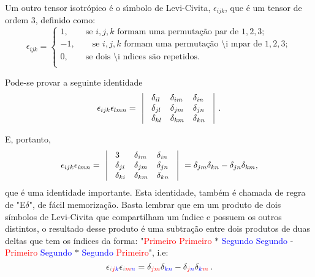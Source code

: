 Um outro tensor isotr\'opico \'e o s\'\i mbolo de Levi-Civita,
$\epsilon_{ijk}$, que \'e um tensor de ordem $3$, definido como:
\begin{equation}
\epsilon_{ijk}=\left\{ \begin{array}{l}
           1,\mbox{   }\mbox{   }\mbox{   }\mbox{se $i,j,k$ formam uma
permuta\c{c}\~ao par de $1,2,3$};\\
          -1,\mbox{   }\mbox{   }\mbox{   }\mbox{se $i,j,k$ formam uma
permuta\c{c}\~ao \'\i mpar de $1,2,3$};\\
           0,\mbox{   }\mbox{   }\mbox{   }\mbox{se dois \'\i ndices s\~ao repetidos}.\\
\end{array} \right.
\end{equation}

Pode-se provar a seguinte identidade
\begin{equation}
\epsilon_{ijk}\epsilon_{lmn}= \begin{array}{lllll}
                \vline & \delta_{il} & \delta_{im} & \delta_{in} & \vline\\
                \vline &\delta_{jl} & \delta_{jm} & \delta_{jn} &\vline\\
                 \vline &\delta_{kl} & \delta_{km} & \delta_{kn} &\vline\\
\end{array}.
\end{equation}

E, portanto,
\begin{equation}
\epsilon_{ijk}\epsilon_{imn}= \begin{array}{lllll}
                \vline & 3 & \delta_{im} & \delta_{in}&\vline \\
                \vline & \delta_{ji} & \delta_{jm} & \delta_{jn}& \vline\\
               \vline & \delta_{ki} & \delta_{km} & \delta_{kn}& \vline\\
\end{array}=\delta_{jm}\delta_{kn}-\delta_{jn}\delta_{km},
\end{equation}
que \'e uma identidade importante. Esta identidade, tamb\'em \'e chamada de
regra de "E$\delta$", de
f\'acil memoriza\c{c}\~ao. Basta lembrar que em um produto de dois s\'imbolos de
Levi-Civita que compartilham um \'indice e possuem os outros distintos, o resultado
desse produto \'e uma subtra\c{c}\~ao entre dois produtos de duas deltas que tem
os \'indices da forma: "\textcolor{red}{Primeiro Primeiro} $*$ 
\textcolor{blue}{Segundo Segundo} - \textcolor{red}{Primeiro}
\textcolor{blue}{Segundo} $*$
\textcolor{blue}{Segundo} \textcolor{red}{Primeiro}", i.e:
\begin{equation}
  \epsilon_{\textcolor{gray}{i}
  \textcolor{red}{j}
  \textcolor{blue}{k}}
  \epsilon_{\textcolor{gray}{i}
  \textcolor{red}{m}
  \textcolor{blue}{n}}
 =
  \delta_{\textcolor{red}{j}
  \textcolor{red}{m}}
  \delta_{\textcolor{blue}{k}
  \textcolor{blue}{n}}
  -
  \delta_{\textcolor{red}{j}
  \textcolor{blue}{n}}
  \delta_{\textcolor{blue}{k}
  \textcolor{red}{m}}
   \,.
\end{equation}

